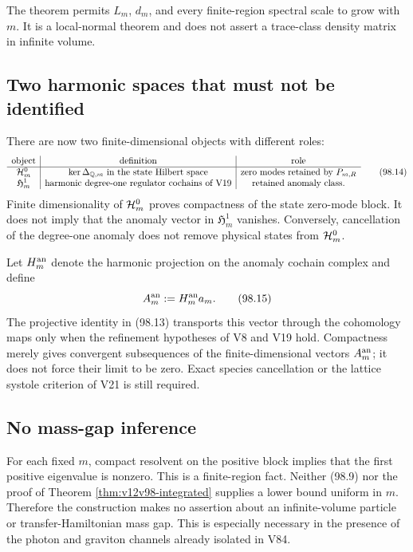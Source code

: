 \documentclass[11pt]{article}
\theoremstyle{remark}
\begin{document}
The theorem permits \(L_m\), \(d_m\), and every finite-region
spectral scale to grow with \(m\).  It is a local-normal theorem and
does not assert a trace-class density matrix in infinite volume.

\subsection{Two harmonic spaces that must not be identified}

There are now two finite-dimensional objects with different roles:
\[
 \begin{array}{c|c|c}
 \text{object}&\text{definition}&\text{role}\\ \hline
 {\cal H}_m^0&
 \ker\Delta_{{\mathbb Q},m}\text{ in the state Hilbert space}&
 \text{zero modes retained by }P_{m,R}\\
 {\mathfrak H}_m^1&
 \text{harmonic degree-one regulator cochains of V19}&
 \text{retained anomaly class}.
 \end{array}                                                     \tag{98.14}
\]
Finite dimensionality of \({\cal H}_m^0\) proves compactness of the
state zero-mode block.  It does not imply that the anomaly vector in
\({\mathfrak H}_m^1\) vanishes.  Conversely, cancellation of the
degree-one anomaly does not remove physical states from
\({\cal H}_m^0\).

Let \(H_m^{\rm an}\) denote the harmonic projection on the anomaly
cochain complex and define
\[
 A_m^{\rm an}:=H_m^{\rm an}a_m.                                \tag{98.15}
\]
The projective identity in (98.13) transports this vector through
the cohomology maps only when the refinement hypotheses of V8 and
V19 hold.  Compactness merely gives convergent subsequences of the
finite-dimensional vectors \(A_m^{\rm an}\); it does not force their
limit to be zero.  Exact species cancellation or the lattice
systole criterion of V21 is still required.

\subsection{No mass-gap inference}

For each fixed \(m\), compact resolvent on the positive block implies
that the first positive eigenvalue is nonzero.  This is a
finite-region fact.  Neither (98.9) nor the proof of Theorem
\ref{thm:v12v98-integrated} supplies a lower bound uniform in
\(m\).  Therefore the construction makes no assertion about an
infinite-volume particle or transfer-Hamiltonian mass gap.  This is
especially necessary in the presence of the photon and graviton
channels already isolated in V84.
\end{document}
